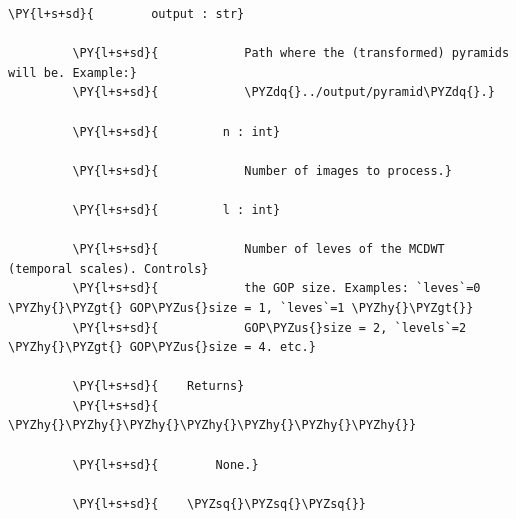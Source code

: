 \begin{Verbatim}[commandchars=\\\{\}]
         \PY{l+s+sd}{        output : str}
         
         \PY{l+s+sd}{            Path where the (transformed) pyramids will be. Example:}
         \PY{l+s+sd}{            \PYZdq{}../output/pyramid\PYZdq{}.}
         
         \PY{l+s+sd}{         n : int}
         
         \PY{l+s+sd}{            Number of images to process.}
         
         \PY{l+s+sd}{         l : int}
         
         \PY{l+s+sd}{            Number of leves of the MCDWT (temporal scales). Controls}
         \PY{l+s+sd}{            the GOP size. Examples: `leves`=0 \PYZhy{}\PYZgt{} GOP\PYZus{}size = 1, `leves`=1 \PYZhy{}\PYZgt{}}
         \PY{l+s+sd}{            GOP\PYZus{}size = 2, `levels`=2 \PYZhy{}\PYZgt{} GOP\PYZus{}size = 4. etc.}
         
         \PY{l+s+sd}{    Returns}
         \PY{l+s+sd}{    \PYZhy{}\PYZhy{}\PYZhy{}\PYZhy{}\PYZhy{}\PYZhy{}\PYZhy{}}
         
         \PY{l+s+sd}{        None.}
         
         \PY{l+s+sd}{    \PYZsq{}\PYZsq{}\PYZsq{}}
             

\end{Verbatim}

